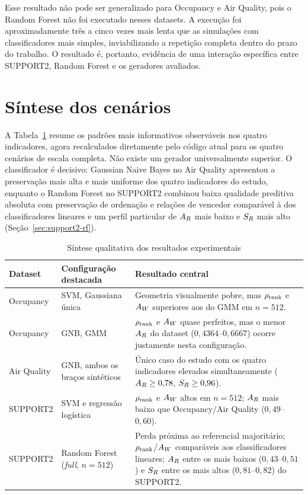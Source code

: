 Esse resultado não pode ser generalizado para Occupancy e Air Quality, pois o Random Forest não foi executado nesses datasets. A execução foi aproximadamente três a cinco vezes mais lenta que as simulações com classificadores mais simples, inviabilizando a repetição completa dentro do prazo do trabalho. O resultado é, portanto, evidência de uma interação específica entre SUPPORT2, Random Forest e os geradores avaliados.

\section{Síntese dos cenários}

A Tabela~\ref{tab:cross-synthesis} resume os padrões mais informativos observáveis nos quatro indicadores, agora recalculados diretamente pelo código atual para os quatro cenários de escala completa. Não existe um gerador universalmente superior. O classificador é decisivo: Gaussian Naive Bayes no Air Quality apresentou a preservação mais alta e mais uniforme dos quatro indicadores do estudo, enquanto o Random Forest no SUPPORT2 combinou baixa qualidade preditiva absoluta com preservação de ordenação e relações de vencedor comparável à dos classificadores lineares e um perfil particular de $A_R$ mais baixo e $S_R$ mais alto (Seção~\ref{sec:support2-rf}).

\begin{table}[H]
  \centering
  \caption{Síntese qualitativa dos resultados experimentais}
  \label{tab:cross-synthesis}
  \begin{tabularx}{\textwidth}{p{2.7cm}p{3.0cm}X}
    \toprule
    Dataset & Configuração destacada & Resultado central \\
    \midrule
    Occupancy & SVM, Gaussiana única & Geometria visualmente pobre, mas $\rho_{\mathrm{rank}}$ e $A_W$ superiores aos do GMM em $n=512$. \\
    Occupancy & GNB, GMM & $\rho_{\mathrm{rank}}$ e $A_W$ quase perfeitos, mas o menor $A_R$ do dataset ($0{,}4364$--$0{,}6667$) ocorre justamente nesta configuração. \\
    Air Quality & GNB, ambos os braços sintéticos & Único caso do estudo com os quatro indicadores elevados simultaneamente ($A_R\geq0{,}78$, $S_R\geq0{,}96$). \\
    SUPPORT2 & SVM e regressão logística & $\rho_{\mathrm{rank}}$ e $A_W$ altos em $n=512$; $A_R$ mais baixo que Occupancy/Air Quality ($0{,}49$--$0{,}60$). \\
    SUPPORT2 & Random Forest (\textit{full}, $n=512$) & Perda próxima ao referencial majoritário; $\rho_{\mathrm{rank}}$/$A_W$ comparáveis aos classificadores lineares; $A_R$ entre os mais baixos ($0{,}43$--$0{,}51$) e $S_R$ entre os mais altos ($0{,}81$--$0{,}82$) do SUPPORT2. \\
    \bottomrule
  \end{tabularx}
\end{table}

